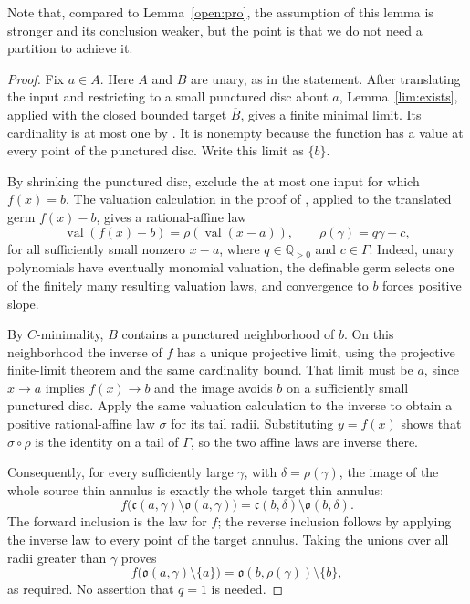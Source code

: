 \documentclass[12pt]{amsart}
\theoremstyle{plain}
\theoremstyle{definition}
\theoremstyle{remark}
\numberwithin{equation}{section}
\theoremstyle{plain}
\newcommand{\gc}{\mathfrak{c}}
\newcommand{\go}{\mathfrak{o}}
\newcommand{\0}{\emptyset}
\DeclareMathOperator{\vv}{val}
\begin{document}
Note that, compared to Lemma~\ref{open:pro}, the assumption of this lemma is stronger and its conclusion weaker, but the point is that we do not need a partition to achieve it.

\begin{proof}
{\color{ResolutionGreen}
Fix $a\in A$. Here $A$ and $B$ are unary, as in the statement. After translating the input and restricting to a small punctured disc about $a$, Lemma~\ref{lim:exists}, applied with the closed bounded target $\overline B$, gives a finite minimal limit. Its cardinality is at most one by \cite[Lemma~9.4]{Yin:special:trans}. It is nonempty because the function has a value at every point of the punctured disc. Write this limit as $\{b\}$.

By shrinking the punctured disc, exclude the at most one input for which $f(x)=b$. The valuation calculation in the proof of \cite[Lemma~8.3]{Yin:special:trans}, applied to the translated germ $f(x)-b$, gives a rational-affine law
\[
\vv(f(x)-b)=\rho(\vv(x-a)),\qquad \rho(\gamma)=q\gamma+c,
\]
for all sufficiently small nonzero $x-a$, where $q\in\mathbb Q_{>0}$ and $c\in\Gamma$. Indeed, unary polynomials have eventually monomial valuation, the definable germ selects one of the finitely many resulting valuation laws, and convergence to $b$ forces positive slope.

By $C$-minimality, $B$ contains a punctured neighborhood of $b$. On this neighborhood the inverse of $f$ has a unique projective limit, using the projective finite-limit theorem and the same cardinality bound. That limit must be $a$, since $x\to a$ implies $f(x)\to b$ and the image avoids $b$ on a sufficiently small punctured disc. Apply the same valuation calculation to the inverse to obtain a positive rational-affine law $\sigma$ for its tail radii. Substituting $y=f(x)$ shows that $\sigma\circ\rho$ is the identity on a tail of $\Gamma$, so the two affine laws are inverse there.

Consequently, for every sufficiently large $\gamma$, with $\delta=\rho(\gamma)$, the image of the whole source thin annulus is exactly the whole target thin annulus:
\[
f\bigl(\gc(a,\gamma)\setminus\go(a,\gamma)\bigr)
 =\gc(b,\delta)\setminus\go(b,\delta).
\]
The forward inclusion is the law for $f$; the reverse inclusion follows by applying the inverse law to every point of the target annulus. Taking the unions over all radii greater than $\gamma$ proves
\[
f\bigl(\go(a,\gamma)\setminus\{a\}\bigr)
 =\go(b,\rho(\gamma))\setminus\{b\},
\]
as required. No assertion that $q=1$ is needed.
}
\end{proof}
\end{document}
